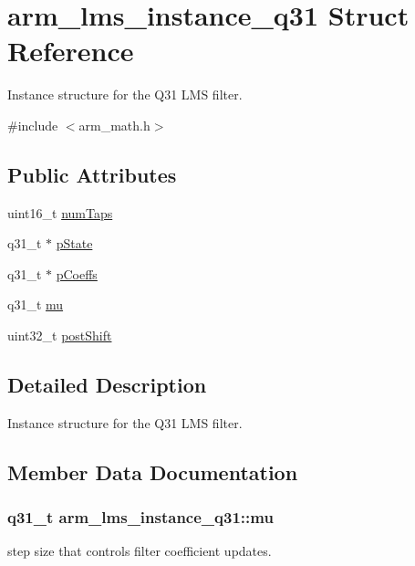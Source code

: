 \hypertarget{structarm__lms__instance__q31}{}\section{arm\+\_\+lms\+\_\+instance\+\_\+q31 Struct Reference}
\label{structarm__lms__instance__q31}


Instance structure for the Q31 L\+MS filter.  




{\ttfamily \#include $<$arm\+\_\+math.\+h$>$}

\subsection*{Public Attributes}
\begin{DoxyCompactItemize}
\item 
uint16\+\_\+t \hyperlink{structarm__lms__instance__q31_ac0d84f7d054555931ef8a62511fbcb8a}{num\+Taps}
\item 
q31\+\_\+t $\ast$ \hyperlink{structarm__lms__instance__q31_a206d47b49de6f357f933ebe61520753c}{p\+State}
\item 
q31\+\_\+t $\ast$ \hyperlink{structarm__lms__instance__q31_a4afe56e991a5416adfd462aa88bda500}{p\+Coeffs}
\item 
q31\+\_\+t \hyperlink{structarm__lms__instance__q31_acb6ca9996b3c5f740d5d6c8e9f4f1d46}{mu}
\item 
uint32\+\_\+t \hyperlink{structarm__lms__instance__q31_a4705a8f0011bb9166e09bf5bd51e595e}{post\+Shift}
\end{DoxyCompactItemize}


\subsection{Detailed Description}
Instance structure for the Q31 L\+MS filter. 

\subsection{Member Data Documentation}
\subsubsection[{\texorpdfstring{mu}{mu}}]{\setlength{\rightskip}{0pt plus 5cm}q31\+\_\+t arm\+\_\+lms\+\_\+instance\+\_\+q31\+::mu}\hypertarget{structarm__lms__instance__q31_acb6ca9996b3c5f740d5d6c8e9f4f1d46}{}\label{structarm__lms__instance__q31_acb6ca9996b3c5f740d5d6c8e9f4f1d46}
step size that controls filter coefficient updates. 
